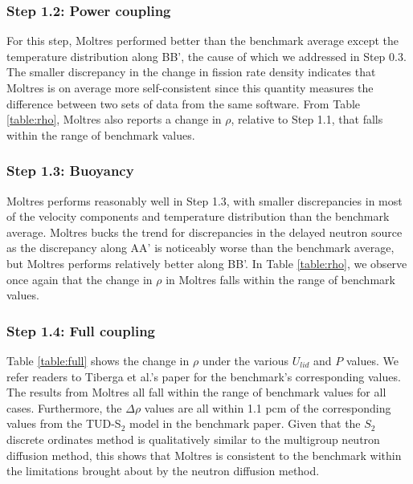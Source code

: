 \subsubsection{Step 1.2: Power coupling}

For this step, Moltres performed better than the benchmark average except
the temperature distribution along BB', the cause of which we
addressed in Step 0.3. The smaller discrepancy in the change in fission rate
density indicates that Moltres is on average more self-consistent since this
quantity measures the difference between two sets of data from the same
software. From Table \ref{table:rho}, Moltres also reports a change in $\rho$,
relative to Step 1.1, that falls within the range of benchmark values.

\subsubsection{Step 1.3: Buoyancy}

Moltres performs reasonably well in Step 1.3, with smaller
discrepancies in most of the velocity components and temperature distribution
than the benchmark average. Moltres bucks the trend for discrepancies
in the delayed neutron source as the discrepancy along AA' is
noticeably worse than the benchmark average, but Moltres performs relatively
better along BB'. In Table \ref{table:rho}, we observe once again that the
change in $\rho$ in Moltres falls within the range of benchmark values.

\subsubsection{Step 1.4: Full coupling}

Table \ref{table:full} shows the change in $\rho$ under the various $U_{lid}$
and $P$ values. We refer readers to Tiberga et al.'s paper
\cite{tiberga_results_2020} for the benchmark's corresponding values.
The results from Moltres all fall within the range of benchmark values for all
cases. Furthermore, the $\Delta\rho$ values are all within 1.1 pcm of the
corresponding values from the TUD-S$_2$ model in the benchmark paper. Given
that the $S_2$ discrete ordinates method is qualitatively similar to the
multigroup neutron diffusion method, this shows that Moltres is
consistent to the benchmark within the limitations brought about by the neutron
diffusion method.

